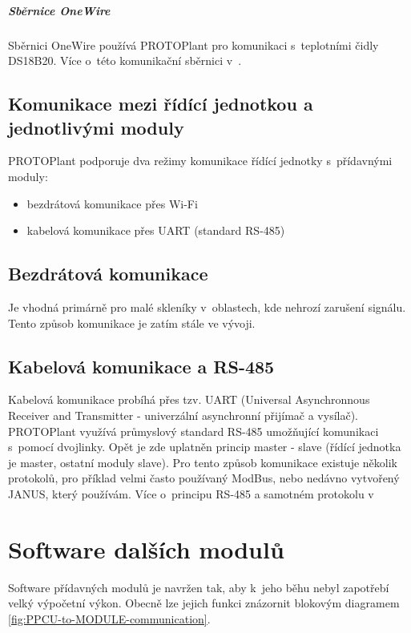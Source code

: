 \paragraph{Sběrnice OneWire}
Sběrnici OneWire používá PROTOPlant pro komunikaci s~teplotními čidly DS18B20. 
Více o~této komunikační sběrnici v~\cite{DS18B20}.

\section{Komunikace mezi řídící jednotkou a jednotlivými moduly}
PROTOPlant podporuje dva režimy komunikace řídící jednotky s~přídavnými moduly:
\begin{itemize}
    \item bezdrátová komunikace přes Wi-Fi
    \item kabelová komunikace přes UART (standard RS-485)
\end{itemize}

\section{Bezdrátová komunikace}
Je vhodná primárně pro malé skleníky v~oblastech, kde nehrozí zarušení signálu.
Tento způsob komunikace je zatím stále ve vývoji.

\section{Kabelová komunikace a RS-485}
Kabelová komunikace probíhá přes tzv. UART (Universal Asynchronnous Receiver and Transmitter - univerzální asynchronní přijímač a vysílač).
PROTOPlant využívá průmyslový standard RS-485 umožňující komunikaci s~pomocí dvojlinky.
Opět je zde uplatněn princip master - slave (řídící jednotka je master, ostatní moduly slave).
Pro tento způsob komunikace existuje několik protokolů, pro příklad velmi často používaný ModBus, nebo nedávno vytvořený JANUS\cite{JANUS}, který používám. 
Více o~principu RS-485 a samotném protokolu v~\cite[21-25]{JANUS}

\chapter{Software dalších modulů}
\label{chap:moduleSoftware}
Software přídavných modulů je navržen tak, aby k~jeho běhu nebyl zapotřebí velký výpočetní výkon.
Obecně lze jejich funkci znázornit blokovým diagramem \ref{fig:PPCU-to-MODULE-communication}.

